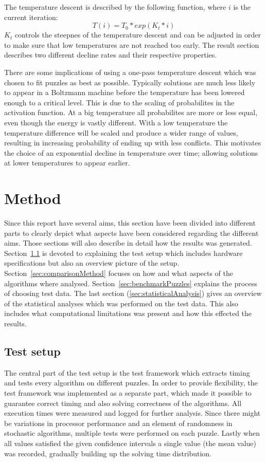 \documentclass[a4paper,11pt]{kth-mag}
\begin{document}
The temperature descent is described by the following function, where $i$ is the current iteration:
\[
T(i) = T_0 * exp(K_t * i)
\]
$K_t$ controls the steepnes of the temperature descent and can be adjusted in order to make sure that low temperatures are not reached too early.
The result section describes two different decline rates and their respective properties.

There are some implications of using a one-pass temperature descent which was chosen to fit puzzles as best as possible.
Typically solutions are much less likely to appear in a Boltzmann machine before the temperature has been lowered enough to a critical level.
This is due to the scaling of probabilites in the activation function.
At a big temperature all probabilites are more or less equal, even though the energy is vastly different.
With a low temperature the temperature difference will be scaled and produce a wider range of values, resulting in increasing probability of ending up with less conflicts.
This motivates the choice of an exponential decline in temperature over time; allowing solutions at lower temperatures to appear earlier.

\chapter{Method}
Since this report have several aims, this section have been divided into different parts to clearly depict what aspects have been considered regarding the different aims. 
Those sections will also describe in detail how the results was generated. 
Section~\ref{sec:testSetupMethod} is devoted to explaining the test setup which includes hardware specifications but also an overview picture of the setup. 
Section~\ref{sec:comparisonMethod} focuses on how and what aspects of the algorithms where analysed.
Section~\ref{sec:benchmarkPuzzles} explains the process of choosing test data.
The last section (\ref{sec:statisticalAnalysis}) gives an overview of the statistical analyses which was performed on the test data.
This also includes what computational limitations was present and how this effected the results. 

\FloatBarrier
\section{Test setup}
\label{sec:testSetupMethod}
The central part of the test setup is the test framework which extracts timing and tests every algorithm on different puzzles. 
In order to provide flexibility, the test framework was implemented as a separate part, which made it possible to guarantee correct timing and also solving correctness of the algorithms.
All execution times were measured and logged for further analysis.
Since there might be variations in processor performance and an element of randomness in stochastic algorithms, multiple tests were performed on each puzzle. 
Lastly when all values satisfied the given confidence intervals a single value (the mean value) was recorded, gradually building up the solving time distribution.
\end{document}
